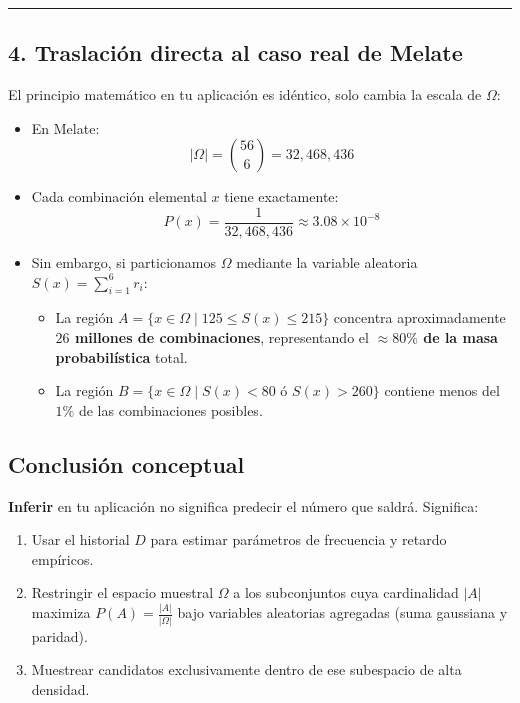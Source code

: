 \documentclass[11pt,a4paper]{article}
\begin{document}
\medskip
\hrule
\medskip

\subsection*{4. Traslación directa al caso real de Melate}

El principio matemático en tu aplicación es idéntico, solo cambia la escala de $\Omega$:

\begin{itemize}
    \item En Melate:
    $$|\Omega| = \binom{56}{6} = 32,468,436$$
    \item Cada combinación elemental $x$ tiene exactamente:
    $$P(x) = \frac{1}{32,468,436} \approx 3.08 \times 10^{-8}$$
    \item Sin embargo, si particionamos $\Omega$ mediante la variable aleatoria $S(x) = \sum_{i=1}^6 r_i$:
    \begin{itemize}
        \item La región $A = \{x \in \Omega \mid 125 \le S(x) \le 215\}$ concentra aproximadamente \textbf{$26$ millones de combinaciones}, representando el \textbf{$\approx 80\%$ de la masa probabilística} total.
        \item La región $B = \{x \in \Omega \mid S(x) < 80 \text{ ó } S(x) > 260\}$ contiene menos del \textbf{$1\%$} de las combinaciones posibles.
    \end{itemize}
\end{itemize}

\subsection*{Conclusión conceptual}

\textbf{Inferir} en tu aplicación no significa predecir el número que saldrá. Significa:
\begin{enumerate}
    \item Usar el historial $D$ para estimar parámetros de frecuencia y retardo empíricos.
    \item Restringir el espacio muestral $\Omega$ a los subconjuntos cuya cardinalidad $|A|$ maximiza $P(A) = \frac{|A|}{|\Omega|}$ bajo variables aleatorias agregadas (suma gaussiana y paridad).
    \item Muestrear candidatos exclusivamente dentro de ese subespacio de alta densidad.
\end{enumerate}
\end{document}
